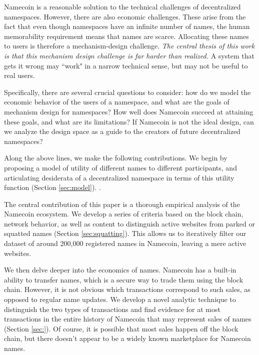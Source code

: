 Namecoin is a reasonable solution to the technical challenges of decentralized namespaces. However, there are also economic challenges. These arise from the fact that even though namespaces have an infinite number of names, the human memorability requirement means that names are scarce. Allocating these names to users is therefore a mechanism-design challenge. {\em The central thesis of this work is that this mechanism design challenge is far harder than realized.} A system that gets it wrong may ``work" in a narrow technical sense, but may not be useful to real users.

Specifically, there are several crucial questions to consider: how do we model the economic behavior of the users of a namespace, and what are the goals of mechanism design for namespaces? How well does Namecoin succeed at attaining these goals, and what are its limitations? If Namecoin is not the ideal design, can we analyze the design space as a guide to the creators of future decentralized namespaces?

Along the above lines, we make the following contributions. We begin by proposing a model of utility of different names to different participants, and articulating desiderata of a decentralized namespace in terms of this utility function (Section \ref{sec:model}). \hi{[Elaborate]}.

The central contribution of this paper is a thorough empirical analysis of the Namecoin ecosystem. We develop a series of criteria based on the block chain, network behavior, as well as content to distinguish active websites from parked or squatted names (Section \ref{sec:squatting}). This allows us to iteratively filter our dataset of around 200,000 registered names in Namecoin, leaving a mere  active websites.

We then delve deeper into the economics of names. Namecoin has a built-in ability to transfer names, which is a secure way to trade them using the block chain. However, it is not obvious which transactions correspond to such sales, as opposed to regular name updates. We develop a novel analytic technique to distinguish the two types of transactions and find evidence for at most  transactions in the entire history of Namecoin that may represent sales of names (Section \ref{sec:}). Of course, it is possible that most sales happen off the block chain, but there doesn't appear to be a widely known marketplace for Namecoin names.


